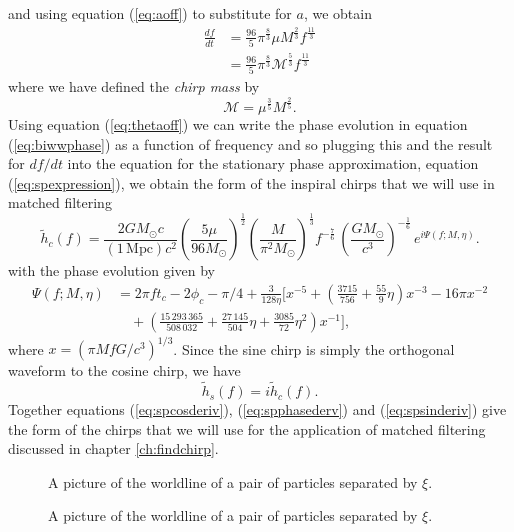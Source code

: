 and using equation (\ref{eq:aoff}) to substitute for $a$, we obtain
\begin{align}
\frac{df}{dt} &= \frac{96}{5} \pi^\frac{8}{3} \mu M^\frac{2}{3} f^\frac{11}{3} \\
&= \frac{96}{5} \pi^\frac{8}{3} \mathcal{M}^\frac{5}{3} f^\frac{11}{3}
\end{align}
where we have defined the \emph{chirp mass} by
\begin{equation}
\mathcal{M} = \mu^\frac{3}{5} M^\frac{2}{5}.
\end{equation}
Using equation (\ref{eq:thetaoff}) we can write the phase evolution in equation
(\ref{eq:biwwphase}) as a function of frequency and so plugging this and the
result for $df/dt$ into the equation for the stationary phase approximation,
equation (\ref{eq:spexpression}), we obtain the form of the inspiral chirps
that we will use in matched filtering
\begin{equation}
\label{eq:spcosderiv}
\tilde{h}_c(f)=\frac{2GM_\odot c}{(1\,\mathrm{Mpc})c^2}
\left(\frac{5\mu}{96M_\odot}\right)^\frac{1}{2}
\left(\frac{M}{\pi^2M_\odot}\right)^\frac{1}{3}
f^{-\frac{7}{6}}\, \left( \frac{GM_\odot}{c^3} \right)^{-\frac{1}{6}}\,
e^{i\Psi(f;M,\eta)}.
\end{equation}
with the phase evolution given by
\begin{equation}
\begin{split}
\Psi(f;M,\eta) &= 2\pi ft_c-2\phi_c-\pi/4+\frac{3}{128\eta}\biggl[x^{-5}+
\left(\frac{3715}{756}+\frac{55}{9}\eta\right)x^{-3}
-16\pi x^{-2} \\
&\quad +\left(\frac{15\,293\,365}{508\,032}+\frac{27\,145}{504}\eta
+\frac{3085}{72}\eta^2\right)x^{-1}\biggr],
\label{eq:spphasederv}
\end{split}
\end{equation}
where $x=(\pi M f G/c^3)^{1/3}$. Since the sine chirp is simply the orthogonal
waveform to the cosine chirp, we have
\begin{equation}
\tilde{h}_s(f)=i\tilde{h}_c(f).
\label{eq:spsinderiv}
\end{equation}
Together equations (\ref{eq:spcosderiv}), (\ref{eq:spphasederv}) and
(\ref{eq:spsinderiv}) give the form of the chirps that we will use for the
application of matched filtering discussed in chapter \ref{ch:findchirp}.

\newpage

\begin{figure}[p]
\begin{center}
A picture of the worldline of a pair of particles separated by $\xi$.
\end{center}
\caption{\label{f:particles}%
A picture of the worldline of a pair of particles separated by $\xi$.
}
\end{figure}

